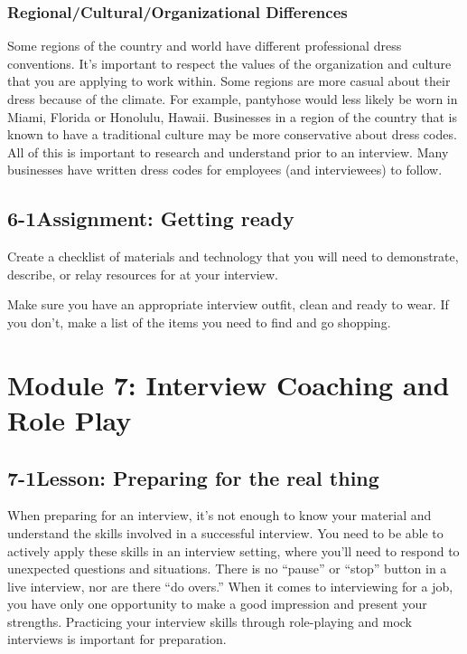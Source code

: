 \subsubsection*{Regional/Cultural/Organizational Differences}
\break Some regions of the country and world have different professional dress conventions. It's important to respect the values of the organization and culture that you are applying to work within. Some regions are more casual about their dress because of the climate. For example, pantyhose would less likely be worn in Miami, Florida or Honolulu, Hawaii. Businesses in a region of the country that is known to have a traditional culture may be more conservative about dress codes. All of this is important to research and understand prior to an interview. Many businesses have written dress codes for employees (and interviewees) to follow.

\pagebreak \subsection*{6-1\quad Assignment: Getting ready}
Create a checklist of materials and technology that you will need to demonstrate, describe, or relay resources for at your interview.

Make sure you have an appropriate interview outfit, clean and ready to wear. If you don't, make a list of the items you need to find and go shopping.

\pagebreak \section*{Module 7:	Interview  Coaching and Role Play}
\noindent\makebox[\textwidth]{\rule{\linewidth}{0.4pt}}  \localtableofcontents
\noindent\makebox[\textwidth]{\rule{\linewidth}{0.4pt}}


\pagebreak \subsection*{7-1\quad Lesson: Preparing for the real thing}
When preparing for an interview, it's not enough to know your material and understand the skills involved in a successful interview. You need to be able to actively apply these skills in an interview setting, where you'll need to respond to unexpected questions and situations. There is no ``pause'' or ``stop'' button in a live interview, nor are there ``do overs.'' When it comes to interviewing for a job, you have only one opportunity to make a good impression and present your strengths. Practicing your interview skills through role-playing and mock interviews is important for preparation.

